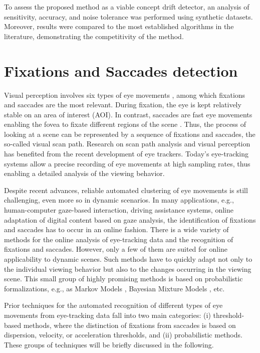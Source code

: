 \documentclass[preprint,12pt]{elsarticle}
\begin{document}
To assess the proposed method as a viable concept drift detector, an analysis of sensitivity, accuracy, and noise tolerance was performed using synthetic datasets. Moreover, results were compared to the most established algorithms in the literature, demonstrating the competitivity of the method.

\section{Fixations and Saccades detection}
\label{sec:eye_tracking}

Visual perception involves six types of eye movements \cite{leigh2015neurology}, among which fixations and saccades are the most relevant.
During fixation, the eye is kept relatively stable on an area of interest (AOI). In contrast, saccades are fast eye movements enabling the fovea to fixate different regions of the scene \cite{privitera:2005:scanpath_theory}.
Thus, the process of looking at a scene can be represented by a sequence of fixations and saccades, the so-called visual scan path.
Research on scan path analysis and visual perception has benefited from the recent development of eye trackers.
Today’s eye-tracking systems allow a precise recording of eye movements at high sampling rates, thus enabling a detailed analysis of the viewing behavior.

Despite recent advances, reliable automated clustering of eye movements is still challenging, even more so in dynamic scenarios.
In many applications, e.g., human-computer gaze-based interaction, driving assistance systems, online adaptation of digital content based on gaze analysis, the identification of fixations and saccades has to occur in an online fashion.
There is a wide variety of methods for the online analysis of eye-tracking data and the recognition of fixations and saccades.
However, only a few of them are suited for online applicability to dynamic scenes.
Such methods have to quickly adapt not only to the individual viewing behavior but also to the changes occurring in the viewing scene.
This small group of highly promising methods is based on probabilistic formalizations, e.g.,
as Markov Models \cite{Salvucci:2000:IFS:355017.355028, Komogortsev2013},
Bayesian Mixture Models \cite{Tafaj:2012:BOC:2168556.2168617}, etc.

Prior techniques for the automated recognition of different types of eye movements from eye-tracking data fall into two main categories:
(i) threshold-based methods, where the distinction of fixations from saccades is based on dispersion, velocity, or acceleration thresholds, and
(ii) probabilistic methods. These groups of techniques will be briefly discussed in the following.
\end{document}
